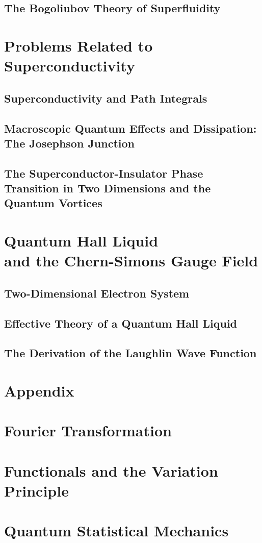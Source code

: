 \documentclass[twoside,11pt]{report}
\begin{document}
\section{The Bogoliubov Theory of Superfluidity}
\chapter{Problems Related to Superconductivity}\label{chap5}
\section{Superconductivity and Path Integrals}
\section{Macroscopic Quantum Effects and Dissipation: The Josephson Junction}
\section{The Superconductor-Insulator Phase Transition in Two Dimensions and the Quantum Vortices}
\chapter{Quantum Hall Liquid\\ and the Chern-Simons Gauge Field}
\section{Two-Dimensional Electron System}
\section{Effective Theory of a Quantum Hall Liquid}
\section{The Derivation of the Laughlin Wave Function}
\appendix

\chapter*{Appendix}
\chapter{Fourier Transformation}
\chapter{Functionals and the Variation Principle}\label{secapb}
\chapter{Quantum Statistical Mechanics}


\renewcommand{\bibname}{References}


\end{document}
